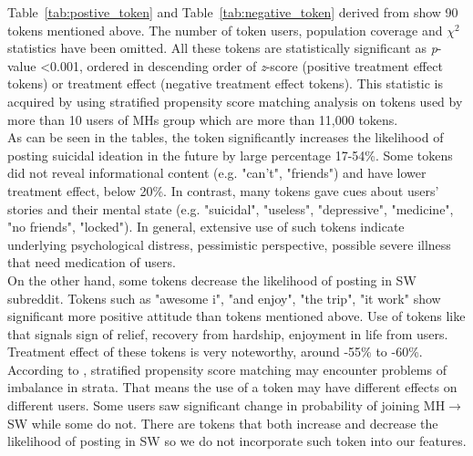Table~\ref{tab:postive_token} and Table~\ref{tab:negative_token} derived from \cite{DeChoudhury2016} show 90 tokens mentioned above. The number of token users, population coverage and $\chi^2$ statistics have been omitted. All these tokens are statistically significant as \textit{p}-value \textless 0.001, ordered in descending order of \textit{z}-score (positive treatment effect tokens) or treatment effect (negative treatment effect tokens). This statistic is acquired by using stratified propensity score matching analysis on tokens used by more than 10 users of MHs group which are more than 11,000 tokens.\\
As can be seen in the tables, the token significantly increases the likelihood of posting suicidal ideation in the future by large percentage 17-54\%. Some tokens did not reveal informational content (e.g. "can't", "friends") and have lower treatment effect, below 20\%. In contrast, many tokens gave cues about users' stories and their mental state (e.g. "suicidal", "useless", "depressive", "medicine", "no friends", "locked"). In general, extensive use of such tokens indicate underlying psychological distress, pessimistic perspective, possible severe illness that need medication of users. \\
On the other hand, some tokens decrease the likelihood of posting in SW subreddit. Tokens such as "awesome i", "and enjoy", "the trip", "it work" show significant more positive attitude than tokens mentioned above. Use of tokens like that signals sign of relief, recovery from hardship, enjoyment in life from users. Treatment effect of these tokens is very noteworthy, around -55\% to -60\%.\\
According to \cite{DeChoudhury2017}, stratified propensity score matching may encounter problems of imbalance in strata. That means the use of a token may have different effects on different users. Some users saw significant change in probability of joining  MH$\rightarrow$SW while some do not. There are tokens that both increase and decrease the likelihood of posting in  SW so we do not incorporate such token into our features.\\
